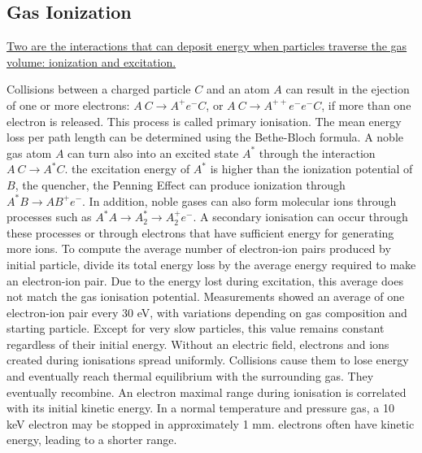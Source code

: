 \subsection{Gas Ionization}
{\red \ul{Two are the interactions that can deposit energy when particles traverse
    the gas volume: ionization and excitation.}}

Collisions between a charged particle $C$ and an atom $A$ can result in the ejection of one or more electrons: 
$A \ C \rightarrow A^+ e^- C$, or $A \ C \rightarrow A^{++} e^- e^- C$, if more than one electron is released.
This process is called primary ionisation. The mean energy loss per path length can be determined using the Bethe-Bloch formula.
A noble gas atom $A$ can turn also into an excited state $A^*$ through the interaction $A \ C \rightarrow A^* C$. 
 the excitation energy of $A^*$ is higher than the ionization potential of  $B$, the quencher, the
Penning Effect can produce ionization through $A^*B \rightarrow A B^+ e^-$.
In addition,  noble gases can
also form molecular ions through processes such as $A^* A \rightarrow A_{2}^{*} \rightarrow A^+_2 e^-$.
A secondary ionisation can occur through these processes or through electrons that have sufficient energy for generating more ions.
To compute the average number of electron-ion pairs produced by  initial particle,
divide its total energy loss by the average energy required to make an electron-ion pair.
Due to the energy lost during excitation, this average 
does not match the gas ionisation potential. Measurements showed an average of one electron-ion pair every 
30 eV, with variations depending on gas composition and starting particle. Except for very slow particles, 
this value remains constant regardless of their initial energy.
Without an electric field, electrons and ions created during ionisations spread uniformly. 
Collisions cause them to lose energy and eventually reach thermal equilibrium with the surrounding gas. 
They eventually recombine. An electron maximal range during ionisation is correlated with its initial kinetic 
energy. In a normal temperature and pressure gas, a 10 keV electron may be stopped in approximately 1 mm. 
 electrons often have  kinetic energy,
leading to a shorter range.
